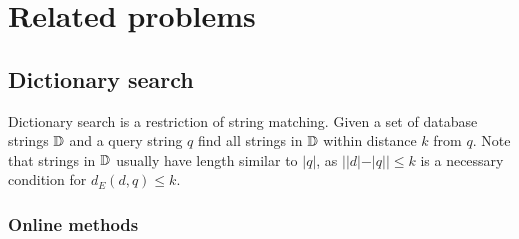 %


\section{Related problems}


\subsection{Dictionary search}

Dictionary search is a restriction of string matching.
Given a set of database strings $\mathbb {D}$ and a query string $q$ find all strings in $\mathbb {D}$ within distance $k$ from $q$.
Note that strings in $\mathbb {D}$ usually have length similar to $|q|$, as $| |d| - |q| | \leq k$ is a necessary condition for $d_E(d,q) \leq k$.

\subsubsection{Online methods}

